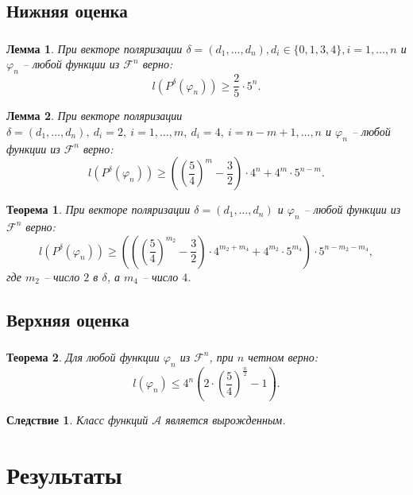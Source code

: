 \documentclass[t]{beamer}
\newtheorem{myth}{Теорема}
\newtheorem{mylm}{Лемма}
\newtheorem*{myco}{Следствие}
\newcommand{\pphi}[1] {P^{\delta}(\varphi_{#1})}
\begin{document}
\subsection{Нижняя оценка}
\begin{frame}
\frametitle{\insertsection}
\framesubtitle{\insertsubsection}
 {
\begin{mylm}
При векторе поляризации $\delta = (d_1,\dots,d_n), d_i \in \{0,1,3,4\}, i = 1,\dots,n$ и
$\varphi_n$ -- любой функции из $\mathcal{F}^n$ верно:
$$l(\pphi{n}) \geqslant \frac{2}{5} \cdot 5^n.$$
\end{mylm}
}
 {
\begin{mylm}
\label{lm24l}
При векторе поляризации $\delta=(d_1,\dots,d_n),\ d_i = 2,\ i=1,\dots,m,\ d_i=4,{\ i=n-m+1,\dots,n}$
и $\varphi_n$ -- любой функции из $\mathcal{F}^n$ верно:
$$l(\pphi{n})\geqslant\left(\left(\frac{5}{4}\right)^m-\frac{3}{2}\right)\cdot4^n+4^m\cdot5^{n-m}.$$
\end{mylm}
}
 {
\begin{myth}
При векторе поляризации $\delta=(d_1,\dots,d_n)$ и $\varphi_n$ -- любой функции из
$\mathcal{F}^n$ верно: $$l(\pphi{n}) \geqslant \left(\left(\left(\frac{5}{4}\right)^{m_2}-
\frac{3}{2}\right) \cdot 4^{m_2+m_4}+4^{m_2}\cdot 5^{m_4} \right) \cdot 5^{n-m_2-m_4},$$
где $m_2$ -- число $2$ в $\delta$, а $m_4$ -- число $4$.
\end{myth}
}
\end{frame}

\subsection{Верхняя оценка}
\begin{frame}
\frametitle{\insertsection}
\framesubtitle{\insertsubsection}
 {
\begin{myth}
\label{thh}
Для любой функции $\varphi_n$ из $\mathcal{F}^n$, при $n$ четном верно:
$$ l(\varphi_n) \leqslant 4^n\left( 2 \cdot \left (\frac{5}{4} \right)^{\frac{n}{2}} - 1 \right).$$
\end{myth}
}
 {
\begin{myco}
Класс функций $\mathcal{A}$ является вырожденным.
\end{myco}
}
\end{frame}

\section{Результаты}
\end{document}
